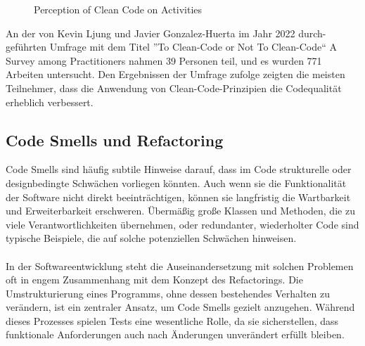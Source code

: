 \documentclass[conference]{IEEEtran}
\begin{document}
\begin{figure}[ht]
    \centering
    \caption{Perception of Clean Code on Activities}
    \label{fig:clean_code_perception}
\end{figure}
 An der von Kevin Ljung und Javier Gonzalez-Huerta im Jahr 2022 durch-
geführten Umfrage mit dem Titel ”To Clean-Code or Not To Clean-Code“ A Survey among
Practitioners nahmen 39 Personen teil, und es wurden 771 Arbeiten untersucht.\cite{ljung2022cleancode} Den Ergebnissen der Umfrage zufolge zeigten die meisten Teilnehmer, dass die Anwendung von
Clean-Code-Prinzipien die Codequalität erheblich verbessert.\\

\subsection{Code Smells und Refactoring}

Code Smells sind häufig subtile Hinweise darauf, dass im Code strukturelle oder designbedingte Schwächen vorliegen könnten. Auch wenn sie die Funktionalität der Software nicht direkt beeinträchtigen,  können sie langfristig die Wartbarkeit und Erweiterbarkeit erschweren. Übermäßig große Klassen und Methoden, die zu viele Verantwortlichkeiten übernehmen, oder redundanter, wiederholter Code sind typische Beispiele, die auf solche potenziellen Schwächen hinweisen.\cite{suryanarayana2014refactoring}
\\\\
In der Softwareentwicklung steht die Auseinandersetzung mit solchen Problemen oft in engem Zusammenhang mit dem Konzept des Refactorings. Die Umstrukturierung eines Programms, ohne dessen bestehendes Verhalten zu verändern, ist ein zentraler Ansatz, um Code Smells gezielt anzugehen. Während dieses Prozesses spielen Tests eine wesentliche Rolle, da sie sicherstellen, dass funktionale Anforderungen auch nach Änderungen unverändert erfüllt bleiben. \cite{Berzal_2005} \\
\end{document}
